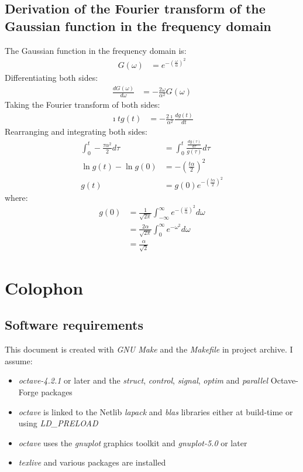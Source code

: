 \documentclass[a4paper,twoside,10pt,english]{report}
\begin{document}
\section{Derivation of the Fourier transform of the Gaussian function in the frequency domain}
The Gaussian function in the frequency domain is:
\begin{align*}
  G\left(\omega\right)&=e^{-\left(\frac{\omega}{\alpha}\right)^{2}}
\end{align*}
Differentiating both sides:
\begin{align*}
  \frac{dG\left(\omega\right)}{d\omega}
  &= -\frac{2\omega}{\alpha^{2}}G\left(\omega\right)
\end{align*}
Taking the Fourier transform of both sides:
\begin{align*}
  \imath{}tg\left(t\right)
  &= -\frac{2\imath}{\alpha^{2}}\frac{dg\left(t\right)}{dt}
\end{align*}
Rearranging and integrating both sides:
\begin{align*}
  \int_{0}^{t}-\frac{\tau\alpha^{2}}{2}d\tau
  &= \int_{0}^{t}\frac{\frac{dg\left(\tau\right)}{d\tau}}
    {g\left(\tau\right)}d\tau \\
  \ln{}g\left(t\right)-\ln{}g\left(0\right)
  &=-\left(\frac{t\alpha}{2}\right)^{2}\\
  g\left(t\right)&=g\left(0\right)e^{-\left(\frac{t\alpha}{2}\right)^{2}}
\end{align*}
where:
\begin{align*}
  g\left(0\right)&= \frac{1}{\sqrt{2\pi}} \int_{-\infty}^{\infty}
                   e^{-\left(\frac{\omega}{\alpha}\right)^{2}}d\omega \\
                 &= \frac{2\alpha}{\sqrt{2\pi}}
                   \int_{0}^{\infty}e^{-\omega^{2}}d\omega \\ 
                 &= \frac{\alpha}{\sqrt{2}}
\end{align*}

\cleardoublepage
\chapter*{\hypertarget{sec:Colophon}{Colophon}}
\section*{Software requirements}
This document is created with \emph{GNU Make} and the \emph{Makefile} in
project archive. I assume:
\begin{itemize}
\item \emph{octave-4.2.1} or later and the \emph{struct}, \emph{control},
  \emph{signal}, \emph{optim} and \emph{parallel} Octave-Forge packages
\item \emph{octave} is linked to the Netlib \emph{lapack} and \emph{blas}
  libraries either at build-time or using \emph{LD\_PRELOAD}
\item \emph{octave} uses the \emph{gnuplot} graphics toolkit and
  \emph{gnuplot-5.0} or later
\item \emph{texlive} and various packages are installed
\end{itemize}
\end{document}
